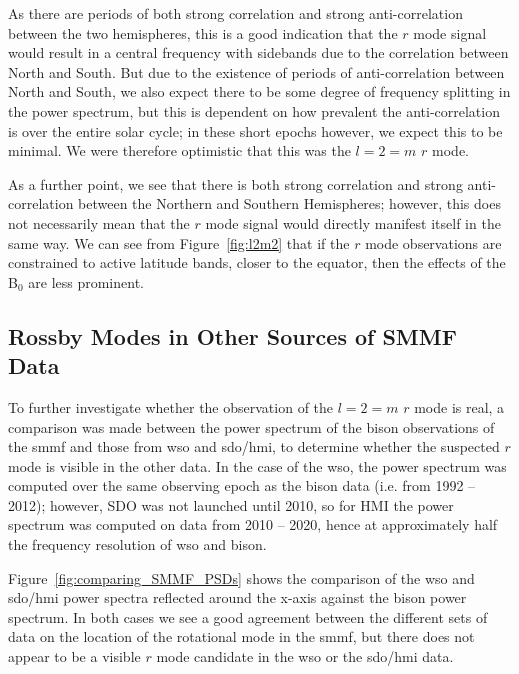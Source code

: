 As there are periods of both strong correlation and strong anti-correlation between the two hemispheres, this is a good indication that the $r$ mode signal would result in a central frequency with sidebands due to the correlation between North and South. But due to the existence of periods of anti-correlation between North and South, we also expect there to be some degree of frequency splitting in the power spectrum, but this is dependent on how prevalent the anti-correlation is over the entire solar cycle; in these short epochs however, we expect this to be minimal. We were therefore optimistic that this was the $l=2=m$ $r$ mode.

As a further point, we see that there is both strong correlation and strong anti-correlation between the Northern and Southern Hemispheres; however, this does not necessarily mean that the $r$ mode signal would directly manifest itself in the same way. We can see from Figure~\ref{fig:l2m2} that if the $r$ mode observations are constrained to active latitude bands, closer to the equator, then the effects of the B$_0$ are less prominent.

\subsection{Rossby Modes in Other Sources of SMMF Data}

To further investigate whether the observation of the  $l=2=m$ $r$ mode is real, a comparison was made between the power spectrum of the \gls{bison} observations of the \gls{smmf} and those from \gls{wso} and \gls{sdo/hmi}, to determine whether the suspected $r$ mode is visible in the other data. In the case of the \gls{wso}, the power spectrum was computed over the same observing epoch as the \gls{bison} data (i.e. from 1992 -- 2012); however, SDO was not launched until 2010, so for HMI the power spectrum was computed on data from 2010 -- 2020, hence at approximately half the frequency resolution of \gls{wso} and \gls{bison}.

Figure~\ref{fig:comparing_SMMF_PSDs} shows the comparison of the \gls{wso} and \gls{sdo/hmi} power spectra reflected around the x-axis against the \gls{bison} power spectrum. In both cases we see a good agreement between the different sets of data on the location of the rotational mode in the \gls{smmf}, but there does not appear to be a visible $r$ mode candidate in the \gls{wso} or the \gls{sdo/hmi} data.

